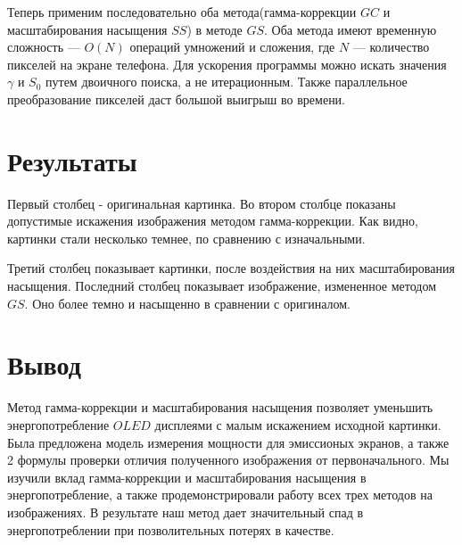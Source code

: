 \documentclass[a4paper, 12pt]{article}
\begin{document}
    Теперь применим последовательно оба метода(гамма-коррекции $GC$ и масштабирования насыщения $SS$) в методе $GS$. Оба метода имеют временную сложность — $O(N)$ операций умножений и сложения, где $N$ — количество пикселей на экране телефона.
    Для ускорения программы можно искать значения $\gamma$ и $S_0$ путем двоичного поиска, а не итерационным. Также параллельное преобразование пикселей даст большой выигрыш во времени. 
    
\section*{Результаты}

    Первый столбец - оригинальная картинка. Во втором столбце показаны допустимые искажения изображения методом гамма-коррекции. Как видно, картинки стали несколько темнее, по сравнению с изначальными.
    
    Третий столбец показывает картинки, после воздействия на них масштабирования насыщения. Последний столбец показывает изображение, измененное методом $GS$. Оно более темно и насыщенно в сравнении с оригиналом.

\section*{Вывод}

	Метод гамма-коррекции и масштабирования насыщения позволяет уменьшить энергопотребление $OLED$ дисплеями с малым искажением исходной картинки. Была предложена модель измерения мощности для эмиссионых экранов, а также 2 формулы проверки отличия полученного изображения от первоначального. Мы изучили вклад гамма-коррекции и масштабирования насыщения в энергопотребление, а также продемонстрировали работу всех трех методов на изображениях. В результате наш метод дает значительный спад в энергопотреблении при позволительных потерях в качестве.
\end{document}
